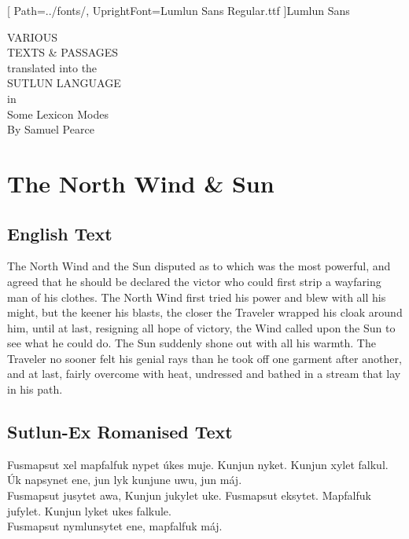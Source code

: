 \documentclass{book}
\begin{document}
\newfontfamily{\lmln}[
    Path=../fonts/,
    UprightFont=Lumlun Sans Regular.ttf
]{Lumlun Sans}

\newcommand{\ortho}[1]{{\lmln\Large{\raggedright#1}\par}}

\begingroup
\centering
\vfill
\Huge{VARIOUS}\\
\Huge{TEXTS \& PASSAGES}\\
\huge{translated into the}\\
\huge{SUTLUN LANGUAGE}\\
\large{in}\\
\Large{Some Lexicon Modes}\\
\vspace{3cm}
\Large{By Samuel Pearce}\\
\vfill\null
\endgroup
\thispagestyle{empty}

\tableofcontents
\pagebreak

\chapter{The North Wind \& Sun}
\section{English Text}

    The North Wind and the Sun disputed as to which was the most powerful,
    and agreed that he should be declared the victor who could first strip a wayfaring man of his clothes.
    The North Wind first tried his power and blew with all his might, but the keener his blasts,
    the closer the Traveler wrapped his cloak around him, until at last, resigning all hope of victory,
    the Wind called upon the Sun to see what he could do. The Sun suddenly shone out with all his warmth.
    The Traveler no sooner felt his genial rays than he took off one garment after another, and at last,
    fairly overcome with heat, undressed and bathed in a stream that lay in his path.

\section{Sutlun-Ex Romanised Text}

    Fusmapsut xel mapfalfuk nypet úkes muje. Kunjun nyket. Kunjun xylet falkul.\\
    Úk napsynet ene, jun lyk kunjune uwu, jun máj.\\
    Fusmapsut jusytet awa, Kunjun jukylet uke. Fusmapsut eksytet.
    Mapfalfuk jufylet. Kunjun lyket ukes falkule.\\
    Fusmapsut nymlunsytet ene, mapfalfuk máj.\\
\end{document}
